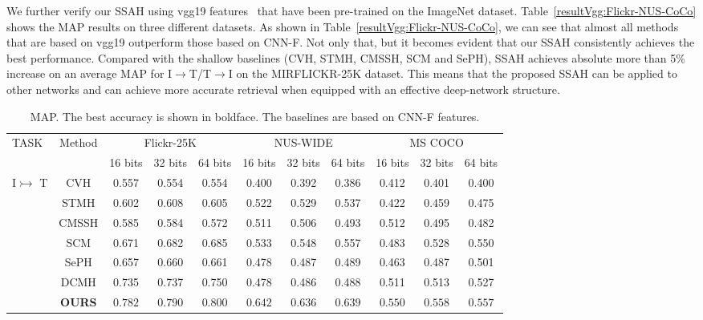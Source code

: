 \documentclass[10pt,twocolumn,letterpaper]{article}
\begin{document}
We further verify our SSAH using vgg19 features~\cite{simonyan2014very} that have been pre-trained on the ImageNet dataset. Table~\ref{resultVgg:Flickr-NUS-CoCo} shows the MAP results on three different datasets. As shown in Table~\ref{resultVgg:Flickr-NUS-CoCo}, we can see that almost all methods that are based on vgg19 outperform those based on CNN-F. Not only that, but it becomes evident that our SSAH consistently achieves the best performance. Compared with the shallow baselines (CVH, STMH, CMSSH, SCM and SePH),  SSAH achieves absolute more than 5\% increase on an average MAP for I$\rightarrow$T/T$\rightarrow$I on the MIRFLICKR-25K dataset. This means that the proposed SSAH can be applied to other networks and can achieve more accurate retrieval when equipped with an effective deep-network structure.
\begin{table*}[!t]		
	\vspace{-0.35cm}
	\begin{center}
		\caption{MAP. The best accuracy is shown in boldface. The baselines are based on CNN-F features.}
		\vspace{-0.3cm}
		\label{resultAlex:Flickr-NUS-CoCo}
		\begin{tabular}{|l|c|c|c|c|c|c|c|c|c|c|}
			\hline
			\multirow{2}{*}{TASK} & \multirow{2}{*}{Method} &\multicolumn{3}{c|}{Flickr-25K} & \multicolumn{3}{c|}{NUS-WIDE}& \multicolumn{3}{c|}{MS COCO}\\
			\cline{3-11}
			& & 16 bits& 32 bits& 64 bits& 16 bits& 32 bits& 64 bits& 16 bits& 32 bits& 64 bits\\
			\hline
			\multirow{7}{*}{I$\rightarrowtail$ T}
			& CVH \cite{Kumar2011Learning} & 0.557 & 0.554 & 0.554 & 0.400 & 0.392 & 0.386 & 0.412 & 0.401 & 0.400\\
			& STMH \cite{Wang2015Semantic}   & 0.602 & 0.608 & 0.605 & 0.522 & 0.529 & 0.537 & 0.422 & 0.459 & 0.475\\
			& CMSSH \cite{Bronstein2010Data}                  & 0.585 & 0.584 & 0.572 & 0.511 & 0.506 & 0.493 & 0.512 & 0.495 & 0.482\\
			& SCM \cite{Zhang2014Large}      & 0.671 & 0.682 & 0.685 & 0.533 & 0.548 & 0.557 & 0.483 & 0.528 & 0.550\\
			& SePH \cite{Lin2015CVPR}        & 0.657 & 0.660 & 0.661 & 0.478 & 0.487 & 0.489 & 0.463 & 0.487 & 0.501\\
			& DCMH \cite{Jiang2017CVPR}      & 0.735 & 0.737 & 0.750 & 0.478 & 0.486 & 0.488 & 0.511 & 0.513 & 0.527\\
			& \textbf{OURS} & $\mathbf{0.782}$ & $\mathbf{0.790}$ & $\mathbf{0.800}$ & $\mathbf{0.642}$ & $\mathbf{0.636}$ & $\mathbf{0.639}$ & $\mathbf{0.550}$ & $\mathbf{0.558}$ & $\mathbf{0.557}$ \\

\end{tabular}
\end{center}
\end{table*}
\end{document}
